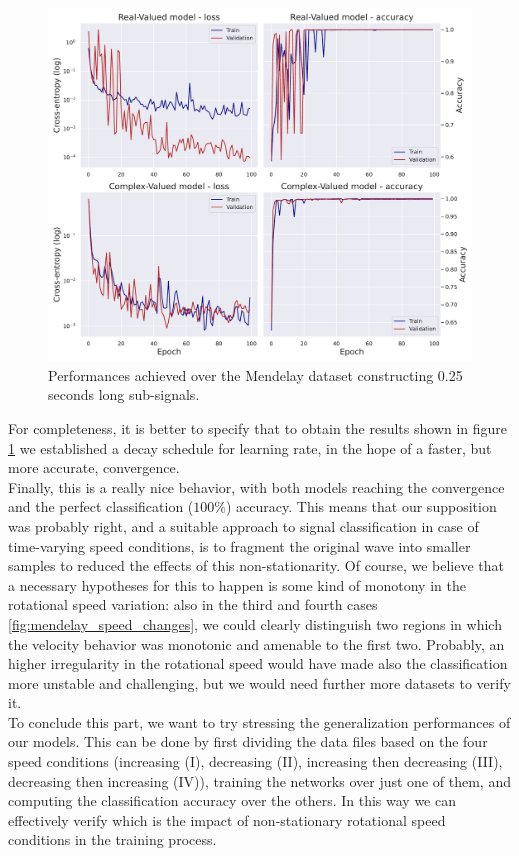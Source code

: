\documentclass[../main.tex]{subfiles}
\begin{document}
\begin{figure}[ht]
	\centering
	\includegraphics[width=\textwidth]{pictures/mendeley_train_final}
	\caption{Performances achieved over the Mendelay dataset constructing 0.25 seconds long sub-signals.}
	\label{fig:mendeley_train_final}
\end{figure}
For completeness, it is better to specify that to obtain the results shown in figure \ref{fig:mendeley_train_final} we established a decay schedule for learning rate, in the hope of a faster, but more accurate, convergence.\\
Finally, this is a really nice behavior, with both models reaching the convergence and the perfect classification ($100\%$) accuracy. This means that our supposition was probably right, and a suitable approach to signal classification in case of time-varying speed conditions, is to fragment the original wave into smaller samples to reduced the effects of this non-stationarity. Of course, we believe that a necessary hypotheses for this to happen is some kind of monotony in the rotational speed variation: also in the third and fourth cases \ref{fig:mendelay_speed_changes}, we could clearly distinguish two regions in which the velocity behavior was monotonic and amenable to the first two. Probably, an higher irregularity in the rotational speed would have made also the classification more unstable and challenging, but we would need further more datasets to verify it.\\
To conclude this part, we want to try stressing the generalization performances of our models. This can be done by first dividing the data files based on the four speed conditions (increasing (I), decreasing (II), increasing then decreasing (III), decreasing then increasing (IV)), training the networks over just one of them, and computing the classification accuracy over the others. In this way we can effectively verify which is the impact of non-stationary rotational speed conditions in the training process.
\end{document}
